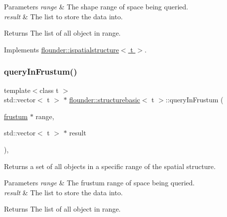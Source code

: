 \begin{DoxyParams}{Parameters}
{\em range} & The shape range of space being queried. \\
\hline
{\em result} & The list to store the data into. \\
\hline
\end{DoxyParams}
\begin{DoxyReturn}{Returns}
The list of all object in range. 
\end{DoxyReturn}


Implements \hyperlink{classflounder_1_1ispatialstructure_abd5dd6c5d3ec13163b4edf70f083eb4c}{flounder\+::ispatialstructure$<$ t $>$}.

\mbox{\label{classflounder_1_1structurebasic_a33f0b06e49ff40068e90f18773dff9e8}} 
\subsubsection{\texorpdfstring{query\+In\+Frustum()}{queryInFrustum()}}
{\footnotesize\ttfamily template$<$class t $>$ \\
std\+::vector$<$ t $>$ $\ast$ \hyperlink{classflounder_1_1structurebasic}{flounder\+::structurebasic}$<$ t $>$\+::query\+In\+Frustum (\begin{DoxyParamCaption}\item[{\hyperlink{classflounder_1_1frustum}{frustum} $\ast$}]{range,  }\item[{std\+::vector$<$ t $>$ $\ast$}]{result }\end{DoxyParamCaption})\hspace{0.3cm}{\ttfamily [override]}, {\ttfamily [virtual]}}



Returns a set of all objects in a specific range of the spatial structure. 


\begin{DoxyParams}{Parameters}
{\em range} & The frustum range of space being queried. \\
\hline
{\em result} & The list to store the data into. \\
\hline
\end{DoxyParams}
\begin{DoxyReturn}{Returns}
The list of all object in range. 
\end{DoxyReturn}


